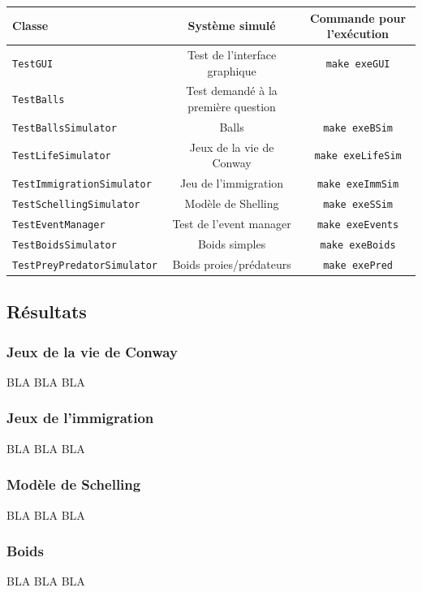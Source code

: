 \documentclass [a4paper,11pt,titlepage] {article}
\begin{document}
\begin{center}
\begin{tabular}{|l|c|c|}
  \hline
    Classe & Système simulé & Commande pour l'exécution \\
  \hline
  \texttt{TestGUI} & Test de l'interface graphique & \texttt{make exeGUI}\\
  \hline
   \texttt{TestBalls} & Test demandé à la première question & \\
  \hline
  \texttt{TestBallsSimulator} & Balls & \texttt{make exeBSim}\\
  \hline
  \texttt{TestLifeSimulator} & Jeux de la vie de Conway & \texttt{make exeLifeSim}\\
  \hline
  \texttt{TestImmigrationSimulator} & Jeu de l'immigration & \texttt{make exeImmSim}\\
  \hline
  \texttt{TestSchellingSimulator} & Modèle de Shelling & \texttt{make exeSSim}\\
  \hline
  \texttt{TestEventManager} & Test de l'event manager & \texttt{make exeEvents}\\
  \hline
  \texttt{TestBoidsSimulator} & Boids simples & \texttt{make exeBoids}\\
  \hline
  \texttt{TestPreyPredatorSimulator} & Boids proies/prédateurs  & \texttt{make exePred}\\
  \hline
  
 
\end{tabular}
\end{center}

\subsection {Résultats}
\subsubsection {Jeux de la vie de Conway}
BLA BLA BLA

\subsubsection {Jeux de l'immigration}
BLA BLA BLA

\subsubsection {Modèle de Schelling}
BLA BLA BLA

\subsubsection {Boids}
BLA BLA BLA
\end{document}
